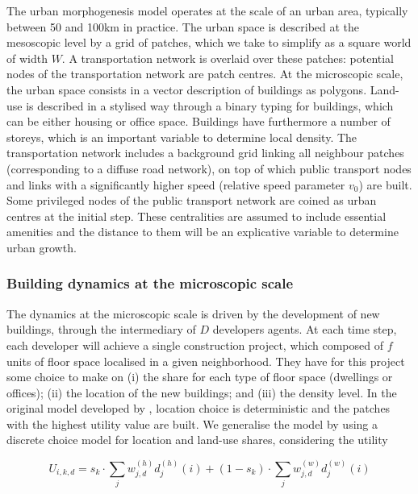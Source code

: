 \documentclass[letterpaper]{article}
\begin{document}
The urban morphogenesis model operates at the scale of an urban area, typically between 50 and 100km in practice. The urban space is described at the mesoscopic level by a grid of patches, which we take to simplify as a square world of width $W$. A transportation network is overlaid over these patches: potential nodes of the transportation network are patch centres. At the microscopic scale, the urban space consists in a vector description of buildings as polygons. Land-use is described in a stylised way through a binary typing for buildings, which can be either housing or office space. Buildings have furthermore a number of storeys, which is an important variable to determine local density. The transportation network includes a background grid linking all neighbour patches (corresponding to a diffuse road network), on top of which public transport nodes and links with a significantly higher speed (relative speed parameter $v_0$) are built. Some privileged nodes of the public transport network are coined as urban centres at the initial step. These centralities are assumed to include essential amenities and the distance to them will be an explicative variable to determine urban growth.

\subsubsection{Building dynamics at the microscopic scale}

The dynamics at the microscopic scale is driven by the development of new buildings, through the intermediary of $D$ developers agents. At each time step, each developer will achieve a single construction project, which composed of $f$ units of floor space localised in a given neighborhood. They have for this project some choice to make on (i) the share for each type of floor space (dwellings or offices); (ii) the location of the new buildings; and (iii) the density level. In the original model developed by \cite{raimbault2014hybrid}, location choice is deterministic and the patches with the highest utility value are built. We generalise the model by using a discrete choice model for location and land-use shares, considering the utility

\[
U_{i,k,d} = s_k \cdot \sum_j w_{j,d}^{(h)} d_j^{(h)}(i) + (1 - s_k) \cdot \sum_j w_{j,d}^{(w)} d_j^{(w)}(i)
\]
\end{document}

